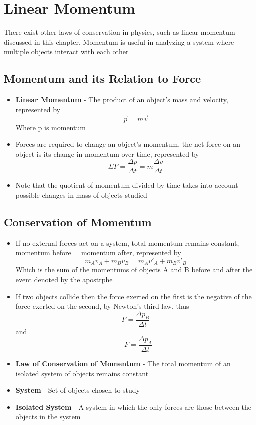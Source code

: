 \section{Linear Momentum}
There exist other laws of conservation in physics, such as linear momentum discussed in this chapter. Momentum is useful in analyzing a system where multiple objects interact with each other

\subsection{Momentum and its Relation to Force}
\begin{itemize}
    \item \textbf{Linear Momentum} - The product of an object's mass and velocity, represented by \[\vec{p}=m\vec{v}\] Where p is momentum
    \item Forces are required to change an object's momentum, the net force on an object is its change in momentum over time, represented by \[\Sigma F=\frac{\Delta p}{\Delta t}=m\frac{\Delta v}{\Delta t}\]
    \item Note that the quotient of momentum divided by time takes into account possible changes in mass of objects studied
    
\end{itemize}

\subsection{Conservation of Momentum}
\begin{itemize}
    \item If no external forces act on a system, total momentum remains constant, momentum before = momentum after, represented by \[m_Av_A+m_Bv_B=m_Av'_A+m_Bv'_B\] Which is the sum of the momentums of objects A and B before and after the event denoted by the apostrphe
    \item If two objects collide then the force exerted on the first is the negative of the force exerted on the second, by Newton's third law, thus \[F=\frac{\Delta p_B}{\Delta t}\] and \[-F=\frac{\Delta p_A}{\Delta t}\]
    \item \textbf{Law of Conservation of Momentum} - The total momentum of an isolated system of objects remains constant
    \item \textbf{System} - Set of objects chosen to study
    \item \textbf{Isolated System} - A system in which the only forces are those between the objects in the system
\end{itemize}


